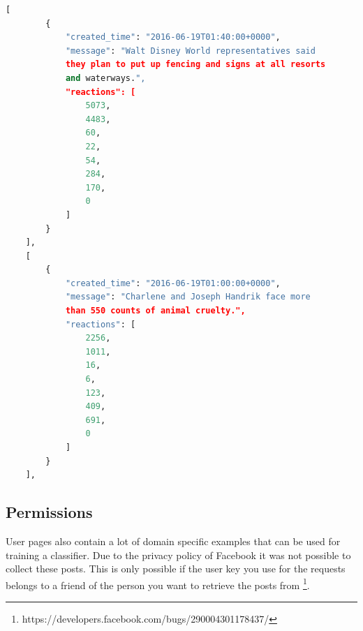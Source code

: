 \documentclass[
10pt, %
a4paper, %
oneside, %
headinclude,footinclude, %
BCOR5mm, %
]{scrartcl}
\begin{document}
\begin{lstlisting}[language=Python, caption=Example JSON data]
[
        {
            "created_time": "2016-06-19T01:40:00+0000",
            "message": "Walt Disney World representatives said
            they plan to put up fencing and signs at all resorts
            and waterways.",
            "reactions": [
                5073,
                4483,
                60,
                22,
                54,
                284,
                170,
                0
            ]
        }
    ],
    [
        {
            "created_time": "2016-06-19T01:00:00+0000",
            "message": "Charlene and Joseph Handrik face more
            than 550 counts of animal cruelty.",
            "reactions": [
                2256,
                1011,
                16,
                6,
                123,
                409,
                691,
                0
            ]
        }
    ],
\end{lstlisting}

\subsection{Permissions}
User pages also contain a lot of domain specific examples that can be used for training a classifier. Due to the privacy policy of Facebook it was not possible to collect these posts. This is only possible if the user key you use for the requests belongs to a friend of the person you want to retrieve the posts from \footnote{https://developers.facebook.com/bugs/290004301178437/}. 
\end{document}
